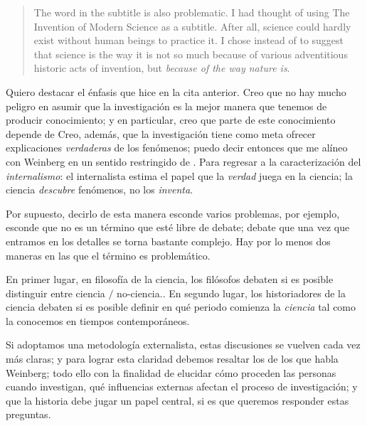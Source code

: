 	\begin{quote}
	
	The word  in the subtitle is also problematic.
	I had thought of using The Invention of Modern Science as
	a subtitle. After all, science could hardly exist without human
	beings to practice it. I chose  instead of
	 to suggest that science is the way it is not so
	much because of various adventitious historic acts of invention,
	but \emph{because of the way nature is}. \parencite[Prefacio,
	énfasis agregado]{Weinberg2015}

	\end{quote}

Quiero destacar el énfasis que hice en la cita anterior. Creo que no hay
mucho peligro en asumir que la investigación es la mejor manera que
tenemos de producir conocimiento; y en particular, creo que parte de este
conocimiento depende de  Creo,
además, que la investigación tiene como meta ofrecer explicaciones
\emph{verdaderas} de los fenómenos; puedo decir entonces que me alíneo con
Weinberg en un sentido restringido de . Para regresar a la caracterización del
\emph{internalismo}: el internalista estima el papel que la \emph{verdad}
juega en la ciencia; la ciencia \emph{descubre} fenómenos, no los
\emph{inventa}.

Por supuesto, decirlo de esta manera esconde varios problemas, por
ejemplo, esconde que  no es un término que esté libre de
debate; debate que una vez que entramos en los detalles se torna bastante
complejo. Hay por lo menos dos maneras en las que el término es
problemático.

En primer lugar, en filosofía de la ciencia, los filósofos debaten si es posible distinguir entre ciencia $/$ no-ciencia.. 
En segundo lugar, los historiadores de la ciencia debaten si es
posible definir en qué periodo comienza la \emph{ciencia} tal como la
conocemos en tiempos contemporáneos.

Si adoptamos una metodología externalista, estas discusiones se vuelven cada vez más claras; y para lograr esta claridad debemos resaltar los  de los que habla Weinberg; todo ello con la finalidad de elucidar cómo proceden las personas cuando investigan, qué influencias externas afectan el proceso de investigación; y que la historia debe jugar un papel central, si es que queremos responder estas preguntas.

